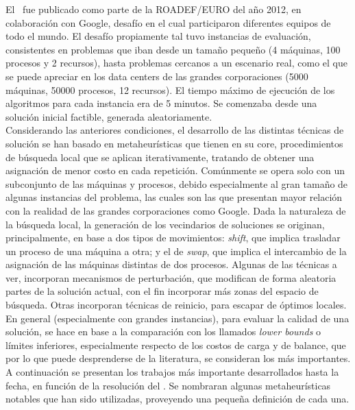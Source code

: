 
El \mrp\ fue publicado como parte de la ROADEF/EURO del año 2012, en colaboración con Google, desafío en el cual participaron diferentes equipos de todo el mundo. El desafío propiamente tal tuvo instancias de evaluación, consistentes en problemas que iban desde un tamaño pequeño (4 máquinas, 100 procesos y 2 recursos), hasta problemas cercanos a un escenario real, como el que se puede apreciar en los data centers de las grandes corporaciones (5000 máquinas, 50000 procesos, 12 recursos). El tiempo máximo de ejecución de los algoritmos para cada instancia era de 5 minutos. Se comenzaba desde una solución inicial factible, generada aleatoriamente.  \\
Considerando las anteriores condiciones, el desarrollo de las distintas técnicas de solución se han basado en metaheurísticas que tienen en su core, procedimientos de búsqueda local que se aplican iterativamente, tratando de obtener una asignación de menor costo en cada repetición. Comúnmente se opera solo con un subconjunto de las máquinas y procesos, debido especialmente al gran tamaño de algunas instancias del problema, las cuales son las que presentan mayor relación con la realidad de las grandes corporaciones como Google. Dada la naturaleza de la búsqueda local, la generación de los vecindarios de soluciones se originan, principalmente, en base a dos tipos de movimientos: \textit{shift}, que implica trasladar un proceso de una máquina a otra; y el de \textit{swap}, que implica el intercambio de la asignación de las máquinas distintas de dos procesos. Algunas de las técnicas a ver, incorporan mecanismos de perturbación, que modifican de forma aleatoria partes de la solución actual, con el fin incorporar más zonas del espacio de búsqueda. Otras incorporan técnicas de reinicio, para escapar de óptimos locales. En general (especialmente con grandes instancias), para evaluar la calidad de una solución, se hace en base a la comparación con los llamados \textit{lower bounds} o límites inferiores, especialmente respecto de los costos de carga y de balance, que por lo que puede desprenderse de la literatura, se consideran los más importantes.\\
A continuación se presentan los trabajos más importante desarrollados hasta la fecha, en función de la resolución del \mrp. Se nombraran algunas metaheurísticas notables que han sido utilizadas, proveyendo una pequeña definición de cada una.

